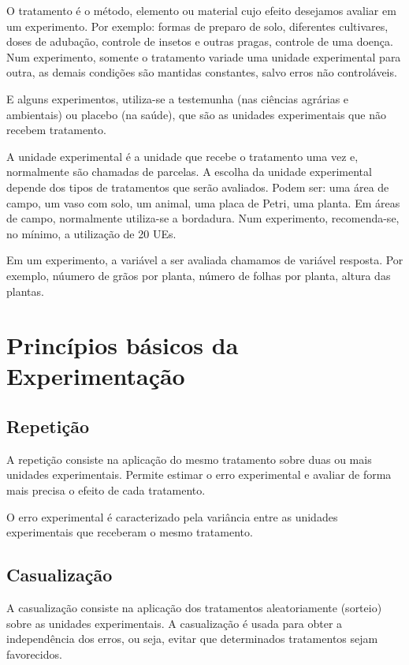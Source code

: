 \documentclass[12pt,brazil,oneside]{book}
\begin{document}
O tratamento é o método, elemento ou material cujo efeito desejamos avaliar em um experimento. Por exemplo: formas de preparo de solo, diferentes cultivares, doses de adubação, controle de insetos e outras pragas, controle de uma doença. Num experimento, somente o tratamento variade uma unidade experimental para outra, as demais condições são mantidas constantes, salvo erros não controláveis.

E alguns experimentos, utiliza-se a testemunha (nas ciências agrárias e ambientais) ou placebo (na saúde), que são as unidades experimentais que não recebem tratamento.

A unidade experimental é a unidade que recebe o tratamento uma vez e, normalmente são chamadas de parcelas. A escolha da unidade experimental depende dos tipos de tratamentos que serão avaliados. Podem ser: uma área de campo, um vaso com solo, um animal, uma placa de Petri, uma planta. Em áreas de campo, normalmente utiliza-se a bordadura. Num experimento, recomenda-se, no mínimo, a utilização de 20 UEs.

Em um experimento, a variável a ser avaliada chamamos de variável resposta. Por exemplo, núumero de grãos por planta, número de folhas por planta, altura das plantas.

\hypertarget{principios-basicos-da-experimentacao}{%
\section{Princípios básicos da Experimentação}\label{principios-basicos-da-experimentacao}}

\hypertarget{repeticao}{%
\subsection{Repetição}\label{repeticao}}

A repetição consiste na aplicação do mesmo tratamento sobre duas ou mais unidades experimentais. Permite estimar o erro experimental e avaliar de forma mais precisa o efeito de
cada tratamento.

O erro experimental é caracterizado pela variância entre as unidades experimentais que receberam o mesmo tratamento.

\hypertarget{casualizacao}{%
\subsection{Casualização}\label{casualizacao}}

A casualização consiste na aplicação dos tratamentos aleatoriamente (sorteio) sobre as unidades experimentais. A casualização é usada para obter a independência dos erros, ou seja, evitar que determinados tratamentos sejam favorecidos.
\end{document}
